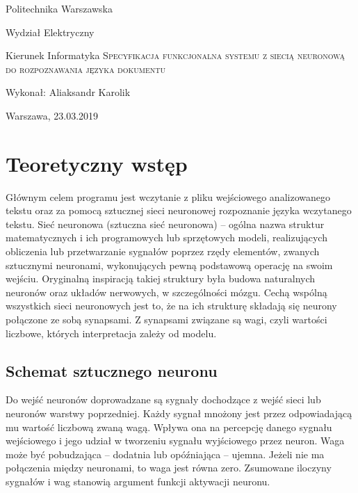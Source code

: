 \documentclass[8pt]{article}
\begin{document}
	\begin{titlepage}
		\begin{center}
			\Large
			Politechnika Warszawska 
			
			Wydział Elektryczny 
			
			Kierunek Informatyka 
			\vfill
			\Huge \textsc{Specyfikacja funkcjonalna systemu z siecią neuronową do rozpoznawania języka dokumentu}
		\end{center}
		\vfill
		
		
		
		\begin{center}
			\Large Wykonał: Aliaksandr Karolik 
		\end{center}
		\begin{center}
			\Large	Warszawa, 23.03.2019
		\end{center}
	
		
		
	\end{titlepage}
	\newpage
	\Large\tableofcontents
	
	
	\newpage

\section{Teoretyczny wstęp}
\hspace*{1 cm} Głównym celem programu jest wczytanie z pliku wejściowego analizowanego tekstu oraz za pomocą sztucznej sieci neuronowej rozpoznanie języka wczytanego tekstu.\newline
\hspace*{1 cm} Sieć neuronowa (sztuczna sieć neuronowa) – ogólna
nazwa struktur matematycznych i ich programowych
lub sprzętowych modeli, realizujących obliczenia lub
przetwarzanie sygnałów poprzez rzędy elementów,
zwanych sztucznymi neuronami, wykonujących
pewną podstawową operację na swoim wejściu.
Oryginalną inspiracją takiej struktury była budowa
naturalnych neuronów oraz układów nerwowych, w
szczególności mózgu. \newline
\hspace*{1 cm} Cechą wspólną wszystkich sieci neuronowych
jest to, że na ich strukturę składają się neurony
połączone ze sobą synapsami. Z synapsami
związane są wagi, czyli wartości liczbowe,
których interpretacja zależy od modelu.
\subsection{Schemat sztucznego neuronu}
\hspace*{1 cm}Do wejść neuronów doprowadzane są sygnały dochodzące z wejść sieci lub neuronów warstwy
poprzedniej. Każdy sygnał mnożony jest przez odpowiadającą mu wartość liczbową
zwaną wagą. Wpływa ona na percepcję danego sygnału wejściowego i jego udział w
tworzeniu sygnału wyjściowego przez neuron. \newline
\hspace*{1 cm}Waga może być pobudzająca -- dodatnia lub opóźniająca -- ujemna.
Jeżeli nie ma połączenia między neuronami, to waga jest równa zero. Zsumowane iloczyny sygnałów i wag stanowią argument funkcji aktywacji neuronu.\newpage
\end{document}
